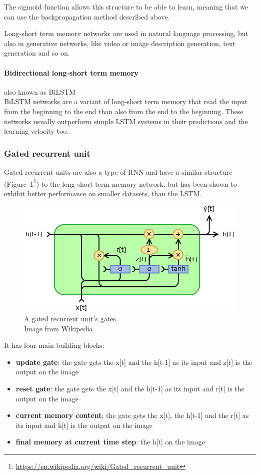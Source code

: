 The sigmoid function allows this structure to be able to learn, meaning that we can use the backpropagation method described above.

Long-short term memory networks are used in natural language processing, but also in generative networks, like video or image description generation, text generation and so on.

\paragraph*{Bidirectional long-short term memory} also known as BiLSTM\\
BiLSTM networks are a variant of long-short term memory that read the input from the beginning to the end than also from the end to the beginning. These networks usually outperform simple LSTM systems in their predictions and the learning velocity too.

\subsubsection{Gated recurrent unit}
Gated recurrent units are also a type of RNN and have a similar structure (Figure~\ref{fig:gru}\footnote{\url{https://en.wikipedia.org/wiki/Gated_recurrent_unit}}) to the long-short term memory network, but has been shown to exhibit better performance on smaller datasets, than the LSTM.
\begin{figure}[!htb]
	\centering
	\includegraphics[scale=0.5]{gru.jpg}
	\caption{A gated recurrent unit's gates.\\Image from Wikipedia}
	\label{fig:gru}
\end{figure}

\begin{minipage}{\textwidth}
It has four main building blocks:
\begin{itemize}
	\item \textbf{update gate}: the gate gets the x[t] and the h[t-1] as its input and z[t] is the output on the image
	\item \textbf{reset gate}: the gate gets the x[t] and the h[t-1] as its input and r[t] is the output on the image
	\item \textbf{current memory content}: the gate gets the x[t], the h[t-1] and the r[t] as its input and \^{h}[t] is the output on the image
	\item \textbf{final memory at current time step}: the h[t] on the image
\end{itemize}
\end{minipage}

